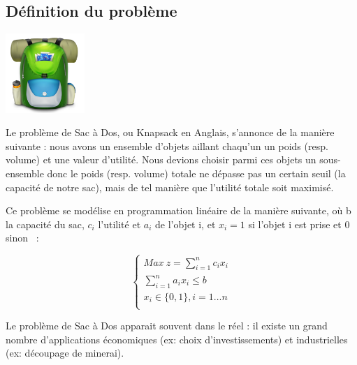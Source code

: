 \subsection{Définition du problème}

\begin{minipage}[b]{0.3\linewidth}
\centering
\includegraphics[height=3cm]{../images/Knapsack.png}
\end{minipage}
\hspace{0.5cm}
\begin{minipage}[b]{0.7\linewidth}
Le problème de Sac à Dos, ou \og Knapsack \fg{} en Anglais, s'annonce de la manière suivante : nous avons un ensemble d'objets aillant chaqu'un un poids (resp. volume) et une valeur d'utilité. Nous devions choisir parmi ces objets un sous-ensemble donc le poids (resp. volume) totale ne dépasse pas un certain seuil (la capacité de notre sac), mais de tel manière que l'utilité totale soit maximisé.
\end{minipage}

Ce problème se modélise en programmation linéaire de la
manière suivante, où b la capacité du sac, $c_i$ l'utilité et $a_i$ de l'objet i, et $x_i = 1$ si l'objet i est prise et $0$ sinon ~:

\begin{equation}
\begin{cases}
Max~z=\sum_{i=1}^nc_ix_i \\
\sum_{i=1}^na_ix_i \leq b \\
x_i \in\{0, 1\}, i=1\dots n\\
\end{cases}
\end{equation}

Le problème de Sac à Dos apparait souvent dans le réel : il existe un grand nombre d'applications économiques (ex: choix d'investissements) et industrielles (ex: découpage de minerai).

